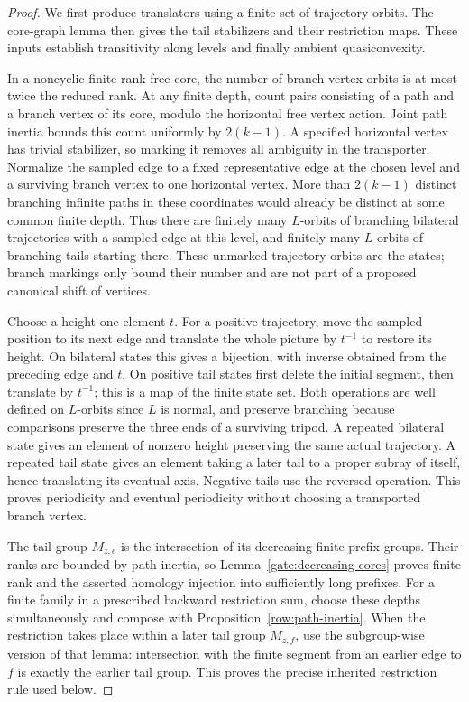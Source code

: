 \begin{proof}
We first produce translators using a finite set of trajectory orbits.
The core-graph lemma then gives the tail stabilizers and their
restriction maps. These inputs establish transitivity along levels
and finally ambient quasiconvexity.

In a noncyclic finite-rank free core, the number of branch-vertex orbits is
at most twice the reduced rank.  At any finite depth, count pairs consisting
of a path and a branch vertex of its core, modulo the horizontal free
vertex action.  Joint path inertia bounds this count uniformly by
$2(k-1)$.  A specified horizontal vertex has trivial stabilizer, so marking
it removes all ambiguity in the transporter. Normalize the sampled edge
to a fixed representative edge at the chosen level and a surviving
branch vertex to one horizontal vertex.
More than \(2(k-1)\) distinct branching infinite paths in these
coordinates would already be distinct at some common finite depth.
Thus there are finitely many \(L\)-orbits of branching bilateral
trajectories with a sampled edge at this level, and finitely many
\(L\)-orbits of branching tails starting there. These unmarked
trajectory orbits are the states; branch markings only bound their
number and are not part of a proposed canonical shift of vertices.

Choose a height-one element \(t\). For a positive trajectory, move
the sampled position to its next edge and translate the whole picture
by \(t^{-1}\) to restore its height. On bilateral states this gives
a bijection, with inverse obtained from the preceding edge and
\(t\). On positive tail states first delete the initial segment,
then translate by \(t^{-1}\); this is a map of the finite state set.
Both operations are well defined on \(L\)-orbits since \(L\) is
normal, and preserve branching because comparisons preserve the
three ends of a surviving tripod. A repeated bilateral state gives
an element of nonzero height preserving the same actual trajectory.
A repeated tail state gives an element taking a later tail to a
proper subray of itself, hence translating its eventual axis.
Negative tails use the reversed operation. This proves periodicity
and eventual periodicity without choosing a transported branch vertex.

The tail group \(M_{z,e}\) is the intersection of its decreasing
finite-prefix groups. Their ranks are bounded by path inertia, so
Lemma~\ref{gate:decreasing-cores} proves finite rank and the asserted
homology injection into sufficiently long prefixes.
For a finite family in a prescribed backward restriction sum, choose
these depths simultaneously and compose with
Proposition~\ref{row:path-inertia}.  When the restriction takes place within a
later tail group $M_{z,f}$, use the subgroup-wise version of that lemma:
intersection with the finite segment from an earlier edge to $f$ is
exactly the earlier tail group.  This proves the precise inherited
restriction rule used below.


\end{proof}
